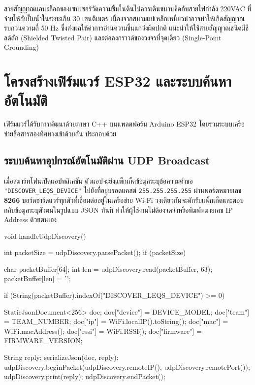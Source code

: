 \begin{noticebox}
    สายสัญญาณแอนะล็อกของเซนเซอร์วัดความชื้นในดินไม่ควรเดินขนานชิดกับสายไฟกำลัง 220VAC ที่จ่ายให้กับปั๊มน้ำในระยะเกิน 30 เซนติเมตร เนื่องจากสนามแม่เหล็กเหนี่ยวนำอาจทำให้เกิดสัญญาณรบกวนความถี่ 50 Hz ซึ่งส่งผลให้ค่าการอ่านความชื้นแกว่งผิดปกติ แนะนำให้ใช้สายสัญญาณชนิดมีชีลด์ถัก (Shielded Twisted Pair) และต่อลงกราวด์ของวงจรที่จุดเดียว (Single-Point Grounding)
\end{noticebox}

\section{โครงสร้างเฟิร์มแวร์ ESP32 และระบบค้นหาอัตโนมัติ}

เฟิร์มแวร์ได้รับการพัฒนาด้วยภาษา C++ บนแพลตฟอร์ม Arduino ESP32 โดยรวมระบบเครือข่ายสื่อสารสองทิศทางเข้าด้วยกัน ประกอบด้วย

\subsection{ระบบค้นหาอุปกรณ์อัตโนมัติผ่าน UDP Broadcast}
เมื่อสมาร์ทโฟนเปิดแอปพลิเคชัน ตัวแอปจะยิงแพ็กเก็ตข้อมูลระบุข้อความคำขอ \texttt{"DISCOVER\_LEQS\_DEVICE"} ไปยังที่อยู่บรอดแคสต์ \texttt{255.255.255.255} ผ่านพอร์ตหมายเลข \textbf{8266} บอร์ดฮาร์ดแวร์ทุกตัวที่เชื่อมต่ออยู่ในเครือข่าย Wi-Fi วงเดียวกันจะดักรับแพ็กเก็ตและตอบกลับข้อมูลระบุตัวตนในรูปแบบ JSON ทันที ทำให้ผู้ใช้งานไม่ต้องจดจำหรือพิมพ์หมายเลข IP Address ด้วยตนเอง

\begin{pythonbox}
void handleUdpDiscovery() {
  int packetSize = udpDiscovery.parsePacket();
  if (packetSize) {
    char packetBuffer[64];
    int len = udpDiscovery.read(packetBuffer, 63);
    packetBuffer[len] = '\0';

    if (String(packetBuffer).indexOf("DISCOVER_LEQS_DEVICE") >= 0) {
      StaticJsonDocument<256> doc;
      doc["device"]   = DEVICE_MODEL;
      doc["team"]     = TEAM_NUMBER;
      doc["ip"]       = WiFi.localIP().toString();
      doc["mac"]      = WiFi.macAddress();
      doc["rssi"]     = WiFi.RSSI();
      doc["firmware"] = FIRMWARE_VERSION;

      String reply;
      serializeJson(doc, reply);
      udpDiscovery.beginPacket(udpDiscovery.remoteIP(), udpDiscovery.remotePort());
      udpDiscovery.print(reply);
      udpDiscovery.endPacket();
    }
  }
}
\end{pythonbox}

